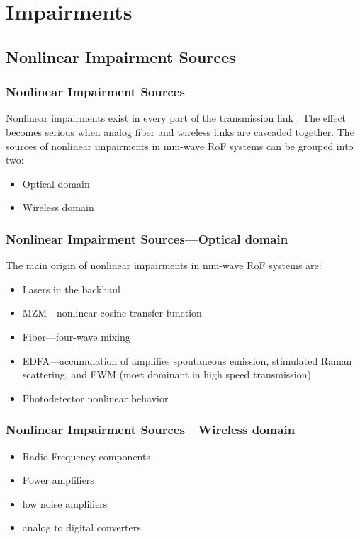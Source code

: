 \documentclass[t]{beamer}
\begin{document}
\section{Impairments}

\subsection{Nonlinear Impairment Sources}
\begin{frame}
    \frametitle{Nonlinear Impairment Sources}
    Nonlinear impairments exist in every part of the transmission link \cite{Liu2017}.
    The effect becomes serious when analog fiber and wireless links are cascaded together.
    The sources of nonlinear impairments in mm-wave RoF systems can be grouped into two:
    \begin{itemize}
        \item Optical domain
        \item Wireless domain
    \end{itemize}
\end{frame}
\begin{frame}
    \frametitle{Nonlinear Impairment Sources---Optical domain}
    
    The main origin of nonlinear impairments in mm-wave RoF systems are:
    \begin{itemize}
        \item Lasers in the backhaul
        \item MZM---nonlinear cosine transfer function
        \item Fiber---four-wave mixing
        \item EDFA---accumulation of amplifies spontaneous emission, stimulated Raman scattering, and FWM (most dominant in high speed transmission)
        \item Photodetector nonlinear behavior
    \end{itemize}
\end{frame}
\begin{frame}
    \frametitle{Nonlinear Impairment Sources---Wireless domain}
    \begin{itemize}
        \item Radio Frequency components
        \item Power amplifiers
        \item low noise amplifiers
        \item analog to digital converters
    \end{itemize}
\end{frame}
\end{document}
